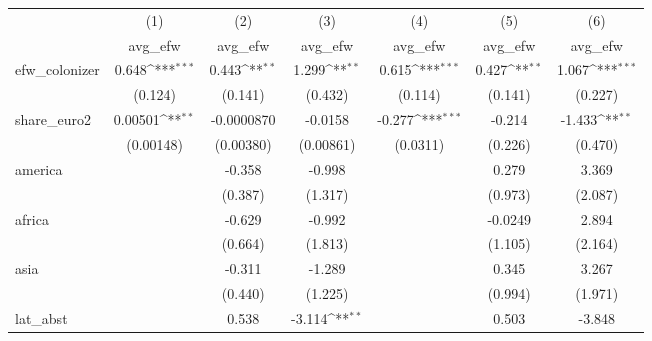 {
\def\sym#1{\ifmmode^{#1}\else\(^{#1}\)\fi}
\begin{tabular}{l*{6}{c}}
\hline\hline
            &\multicolumn{1}{c}{(1)}&\multicolumn{1}{c}{(2)}&\multicolumn{1}{c}{(3)}&\multicolumn{1}{c}{(4)}&\multicolumn{1}{c}{(5)}&\multicolumn{1}{c}{(6)}\\
            &\multicolumn{1}{c}{avg\_efw}&\multicolumn{1}{c}{avg\_efw}&\multicolumn{1}{c}{avg\_efw}&\multicolumn{1}{c}{avg\_efw}&\multicolumn{1}{c}{avg\_efw}&\multicolumn{1}{c}{avg\_efw}\\
\hline
efw\_colonizer&       0.648\sym{***}&       0.443\sym{**} &       1.299\sym{**} &       0.615\sym{***}&       0.427\sym{**} &       1.067\sym{***}\\
            &     (0.124)         &     (0.141)         &     (0.432)         &     (0.114)         &     (0.141)         &     (0.227)         \\
[1em]
share\_euro2 &     0.00501\sym{**} &  -0.0000870         &     -0.0158         &      -0.277\sym{***}&      -0.214         &      -1.433\sym{**} \\
            &   (0.00148)         &   (0.00380)         &   (0.00861)         &    (0.0311)         &     (0.226)         &     (0.470)         \\
[1em]
america     &                     &      -0.358         &      -0.998         &                     &       0.279         &       3.369         \\
            &                     &     (0.387)         &     (1.317)         &                     &     (0.973)         &     (2.087)         \\
[1em]
africa      &                     &      -0.629         &      -0.992         &                     &     -0.0249         &       2.894         \\
            &                     &     (0.664)         &     (1.813)         &                     &     (1.105)         &     (2.164)         \\
[1em]
asia        &                     &      -0.311         &      -1.289         &                     &       0.345         &       3.267         \\
            &                     &     (0.440)         &     (1.225)         &                     &     (0.994)         &     (1.971)         \\
[1em]
lat\_abst    &                     &       0.538         &      -3.114\sym{**} &                     &       0.503         &      -3.848         \\

\end{tabular}}
